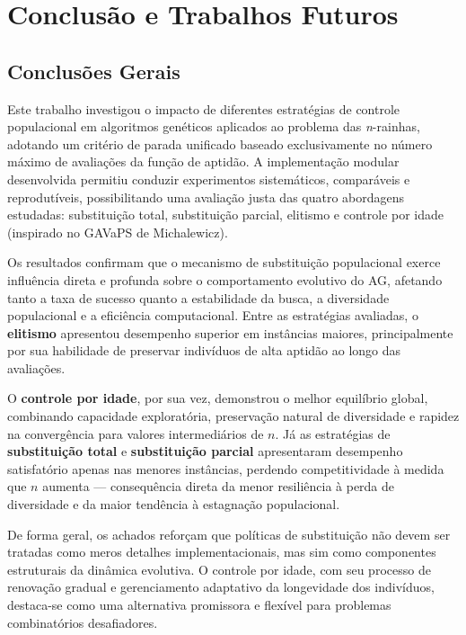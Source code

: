 \section{Conclusão e Trabalhos Futuros}
\label{sec:conclusao}

\subsection{Conclusões Gerais}

Este trabalho investigou o impacto de diferentes estratégias de controle populacional em algoritmos genéticos aplicados ao problema das \textit{n}-rainhas, adotando um critério de parada unificado baseado exclusivamente no número máximo de avaliações da função de aptidão. A implementação modular desenvolvida permitiu conduzir experimentos sistemáticos, comparáveis e reprodutíveis, possibilitando uma avaliação justa das quatro abordagens estudadas: substituição total, substituição parcial, elitismo e controle por idade (inspirado no GAVaPS de Michalewicz).

Os resultados confirmam que o mecanismo de substituição populacional exerce influência direta e profunda sobre o comportamento evolutivo do AG, afetando tanto a taxa de sucesso quanto a estabilidade da busca, a diversidade populacional e a eficiência computacional. Entre as estratégias avaliadas, o \textbf{elitismo} apresentou desempenho superior em instâncias maiores, principalmente por sua habilidade de preservar indivíduos de alta aptidão ao longo das avaliações. 

O \textbf{controle por idade}, por sua vez, demonstrou o melhor equilíbrio global, combinando capacidade exploratória, preservação natural de diversidade e rapidez na convergência para valores intermediários de $n$. Já as estratégias de \textbf{substituição total} e \textbf{substituição parcial} apresentaram desempenho satisfatório apenas nas menores instâncias, perdendo competitividade à medida que $n$ aumenta — consequência direta da menor resiliência à perda de diversidade e da maior tendência à estagnação populacional.

De forma geral, os achados reforçam que políticas de substituição não devem ser tratadas como meros detalhes implementacionais, mas sim como componentes estruturais da dinâmica evolutiva. O controle por idade, com seu processo de renovação gradual e gerenciamento adaptativo da longevidade dos indivíduos, destaca-se como uma alternativa promissora e flexível para problemas combinatórios desafiadores.

